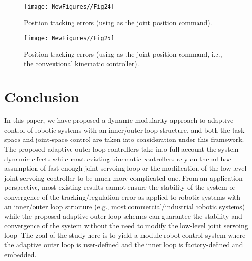 \documentclass[9pt,technote]{IEEEtran}
\begin{document}
{\begin{figure}
\centering
\begin{minipage}[t]{1.0\linewidth}
\centering
\texttt{[image: NewFigures//Fig24]}
\caption{Position tracking errors (using  as the joint position command).}\label{fig:side:a}
\end{minipage}\end{figure}

\begin{figure}
\centering
\begin{minipage}[t]{1.0\linewidth}
\centering
\texttt{[image: NewFigures//Fig25]}
\caption{Position tracking errors (using  as the joint position command, i.e., the conventional kinematic controller).}\label{fig:side:a}
\end{minipage}\end{figure}

\section{Conclusion}

In this paper, we have proposed a dynamic modularity approach to adaptive control of robotic systems with an inner/outer loop structure, and both the task-space and joint-space control are taken into consideration under this framework. The proposed adaptive outer loop controllers take into full account the system dynamic effects while most existing kinematic controllers rely on the ad hoc assumption of fast enough joint servoing loop or the modification of the low-level joint servoing controller to be much more complicated one. From an application perspective, most existing results cannot ensure the stability of the system or convergence of the tracking/regulation error as applied to robotic systems with an inner/outer loop structure (e.g., most commercial/industrial robotic systems) while the proposed adaptive outer loop schemes can guarantee the stability and convergence of the system without the need to modify the low-level joint servoing loop. The goal of the study here is to yield a module robot control system where the adaptive outer loop is user-defined and the inner loop is factory-defined and embedded.

}
\end{document}
